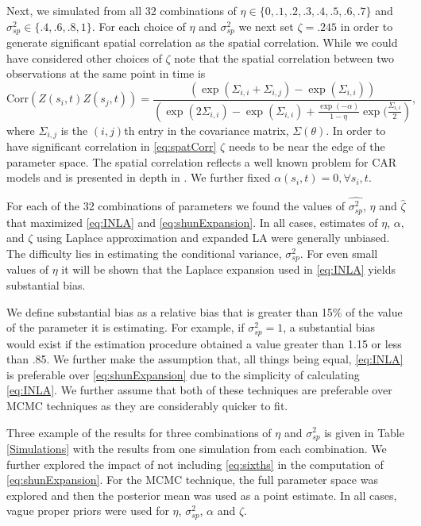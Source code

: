 \documentclass[11pt]{isuthesis}
\begin{document}
	
	Next, we simulated from all 32 combinations of $\eta \in \{0,.1,.2,.3,.4,.5,.6,.7\}$ and $\sigma_{sp}^2 \in \{.4,.6,.8,1\}$.  For each choice of $\eta$ and $\sigma_{sp}^2$ we next set $\zeta=.245$ in order to generate significant spatial correlation as the spatial correlation.  While we could have considered other choices of $\zeta$ note that the spatial correlation between two observations at the same point in time is
	\begin{equation}
	\mbox{Corr}(Z(s_i,t)Z(s_j,t))  = \frac{\left(\exp(\Sigma_{i,i}+\Sigma_{i,j}) -\exp(\Sigma_{i,i})\right)}{\left(\exp(2\Sigma_{i,i}) -\exp(\Sigma_{i,i}) + \frac{\exp(-\alpha)}{1-\eta}\exp(\frac{\Sigma_{i,i}}{2}\right)}\label{eq:spatCorr},
	\end{equation}
	where $\Sigma_{i,j}$ is the $(i,j)$th entry in the covariance matrix, $\Sigma(\theta)$.  In order to have significant correlation in \eqref{eq:spatCorr} $\zeta$ needs to be near the edge of the parameter space.  The spatial correlation reflects a well known problem for CAR models and is presented in depth in \cite{wall2004close}.  We further fixed $\alpha(s_i,t)=0,\forall s_i,t$. 
	
	For each of the 32 combinations of parameters we found the values of $\hat{\sigma_{sp}^2}$, $\hat{\eta}$ and $\hat{\zeta}$ that maximized \eqref{eq:INLA} and \eqref{eq:shunExpansion}.  In all cases, estimates of $\eta$, $\alpha$, and $\zeta$ using Laplace approximation and expanded LA were generally unbiased.  The difficulty lies in estimating the conditional variance, $\sigma_{sp}^2$.  For even small values of $\eta$ it will be shown that the Laplace expansion used in \eqref{eq:INLA} yields substantial bias.
	
	We define substantial bias as a relative bias that is greater than 15\% of the value of the parameter it is estimating.  For example, if $\sigma_{sp}^2=1$, a substantial bias would exist if the estimation procedure obtained a value greater than 1.15 or less than .85.  We further make the assumption that, all things being equal, \eqref{eq:INLA} is preferable over \eqref{eq:shunExpansion} due to the simplicity of calculating \eqref{eq:INLA}.  We further assume that both of these techniques are preferable over MCMC techniques as they are considerably quicker to fit.
	
	Three example of the results for three combinations of $\eta$ and $\sigma_{sp}^2$ is given in Table \ref{Simulations} with the results from one simulation from each combination.  We further explored the impact of not including \eqref{eq:sixths} in the computation of \eqref{eq:shunExpansion}.  For the MCMC technique, the full parameter space was explored and then the posterior mean was used as a point estimate.  In all cases, vague proper priors were used for $\eta$, $\sigma_{sp}^2$, $\alpha$ and $\zeta$. 
	
\end{document}
